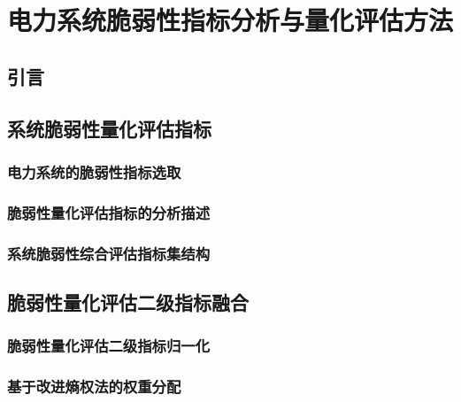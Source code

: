 \chapter{电力系统脆弱性指标分析与量化评估方法}
\label{cha:quanti}

\section{引言}
\label{sec:index4}




\section{系统脆弱性量化评估指标}
\label{sec:describIndex}




\subsection{电力系统的脆弱性指标选取}
\label{sec:pickIndex}





\subsection{脆弱性量化评估指标的分析描述}
\label{sec:wordIndex}




\subsection{系统脆弱性综合评估指标集结构}
\label{sec:IndexSys}




\section{脆弱性量化评估二级指标融合}
\label{sec:processIndex}




\subsection{脆弱性量化评估二级指标归一化}
\label{sec:nomalzMethod}




\subsection{基于改进熵权法的权重分配}
\label{sec:nomalz}





